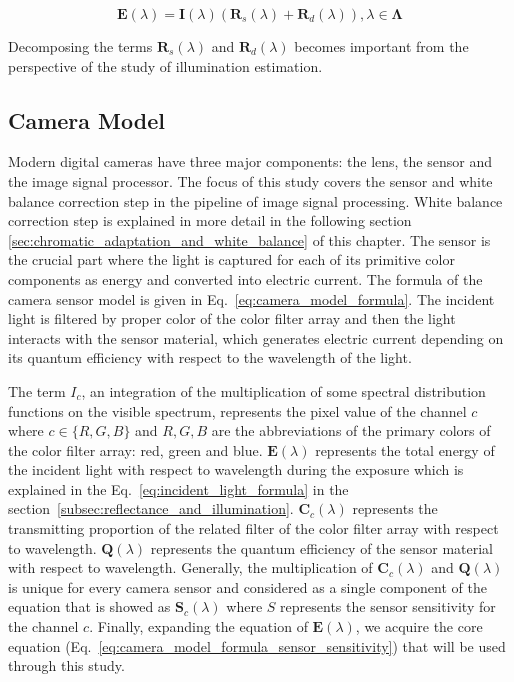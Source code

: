 \begin{equation}
\mathbf{E}(\lambda) = \mathbf{I}(\lambda) (\mathbf{R}_s(\lambda) + \mathbf{R}_d(\lambda)), \lambda \in \mathbf{\Lambda}
\label{eq:dichromatic_incident_light_formula}
\end{equation}

Decomposing the terms $\mathbf{R}_s(\lambda)$ and $\mathbf{R}_d(\lambda)$ becomes important from the perspective of the study of illumination estimation.

\subsection{Camera Model}
\label{subsec:camera_model}

Modern digital cameras have three major components: the lens, the sensor and the image signal processor. The focus of this study covers the sensor and white balance correction step in the pipeline of image signal processing.  White balance correction step is explained in more detail in the following section \ref{sec:chromatic_adaptation_and_white_balance} of this chapter. The sensor is the crucial part where the light is captured for each of its primitive color components as energy and converted into electric current. The formula of the camera sensor model is given in Eq.~\ref{eq:camera_model_formula}. The incident light is filtered by proper color of the color filter array and then the light interacts with the sensor material, which generates electric current depending on its quantum efficiency with respect to the wavelength of the light.

The term $I_c$, an integration of the multiplication of some spectral distribution functions on the visible spectrum, represents the pixel value of the channel $c$ where $c \in \{R,G,B\}$ and $R,G,B$ are the abbreviations of the primary colors of the color filter array: red, green and blue. $\mathbf{E}(\lambda)$ represents the total energy of the incident light with respect to wavelength during the exposure which is explained in the Eq.~\ref{eq:incident_light_formula} in the section~\ref{subsec:reflectance_and_illumination}. $\mathbf{C}_c(\lambda)$ represents the transmitting proportion of the related filter of the color filter array with respect to wavelength. $\mathbf{Q}(\lambda)$ represents the quantum efficiency of the sensor material with respect to wavelength. Generally, the multiplication of $\mathbf{C}_c(\lambda)$ and $\mathbf{Q}(\lambda)$ is unique for every camera sensor and considered as a single component of the equation that is showed as $\mathbf{S}_c(\lambda)$ where $S$ represents the sensor sensitivity for the channel $c$. Finally, expanding the equation of $\mathbf{E}(\lambda)$, we acquire the core equation (Eq.~\ref{eq:camera_model_formula_sensor_sensitivity}) that will be used through this study.

